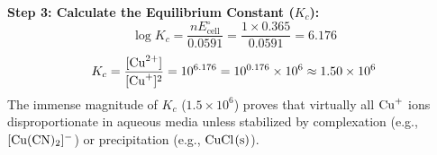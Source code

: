 \begin{examplebox}
\textbf{Step 3: Calculate the Equilibrium Constant ($K_c$):}
\begin{equation*}
    \log K_c = \frac{n E^\circ_{\text{cell}}}{0.0591} = \frac{1 \times 0.365}{0.0591} = 6.176
\end{equation*}
\begin{equation*}
    K_c = \frac{[\ce{Cu^2+}]}{[\ce{Cu+}]^2} = 10^{6.176} = 10^{0.176} \times 10^6 \approx 1.50 \times 10^6
\end{equation*}
The immense magnitude of $K_c$ ($1.5 \times 10^6$) proves that virtually all $\ce{Cu+}$ ions disproportionate in aqueous media unless stabilized by complexation (e.g., $[\ce{Cu(CN)2}]^-$) or precipitation (e.g., $\ce{CuCl(s)}$).
\end{examplebox}
